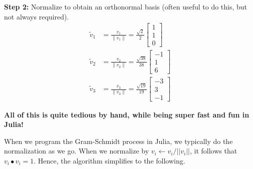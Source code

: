 \textbf{Step 2:} Normalize to obtain an orthonormal basis (often useful to do this, but not always required).\\
	\begin{align*}
		\tilde{v}_1 &= \frac{v_1}{\| v_1 \|} = \frac{\sqrt{2}}{2} \left[ \begin{array}{c} 1  \\ 1  \\ 0 \end{array} \right]\\
		\tilde{v}_2 &= \frac{v_2}{\| v_2 \|} = \frac{\sqrt{38}}{38} \left[ \begin{array}{r} -1 \\ 1 \\ 6  \end{array} \right]\\
		\tilde{v}_3 &= \frac{v_3}{\| v_3 \|} = \frac{\sqrt{19}}{19} \left[ \begin{array}{r} -3  \\ 3\\ -1
			\end{array} \right]
	\end{align*}
	
	
\textbf{\BLUE All of this is quite tedious by hand, while being super fast and fun in Julia!}

\Qed

When we program the Gram-Schmidt process in Julia, we typically do the normalization as we go. When we normalize by ${v_i \leftarrow v_i/||v_i||}$, it follows that $v_i \bullet v_i =1$. Hence, the algorithm simplifies to the following.


